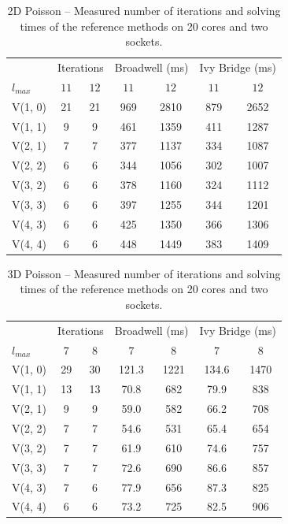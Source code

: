 \begin{table}
	\caption[2D Poisson -- Number of iterations and solving times of the reference methods]{2D Poisson -- Measured number of iterations and solving times of the reference methods on 20 cores and two sockets.}
	\label{table:poisson-2D-reference-methods}
	\centering
	\begin{tabular}{l c c c c c c}
		\toprule
		& \multicolumn{2}{c}{Iterations} & \multicolumn{2}{c}{Broadwell (ms)} & \multicolumn{2}{c}{Ivy Bridge (ms)} \\
		\cmidrule(r){2-3} \cmidrule(r){4-5} \cmidrule(r){6-7}
		$l_{max}$ & $11$& $12$ & $11$ & $12$ & $11$ & $12$\\
		\midrule
		V(1, 0) & 21 & 21 & 969 & 2810 & 879 & 2652 \\
		\midrule
		V(1, 1) & 9 & 9 & 461 & 1359 & 411 & 1287 \\
		\midrule
		V(2, 1) & 7 & 7 & 377 & 1137 & 334 & 1087\\
		\midrule
		V(2, 2) & 6 & 6 & 344 & 1056 & 302 & 1007 \\
		\midrule
		V(3, 2) & 6 & 6 & 378 & 1160 & 324 & 1112 \\
		\midrule
		V(3, 3) & 6 & 6 & 397 & 1255 & 344 & 1201 \\
		\midrule
		V(4, 3) & 6 & 6 & 425 & 1350 & 366 & 1306 \\
		\midrule
		V(4, 4) & 6 & 6 & 448 & 1449 & 383 & 1409\\
		\bottomrule
	\end{tabular}
\end{table}
\begin{table}
	\caption[3D Poisson -- Number of iterations and solving times of the reference methods]{3D Poisson -- Measured number of iterations and solving times of the reference methods on 20 cores and two sockets.}
	\label{table:poisson-3D-reference-methods}
	\centering
	\begin{tabular}{l c c c c c c}
		\toprule
		& \multicolumn{2}{c}{Iterations} & \multicolumn{2}{c}{Broadwell (ms)} & \multicolumn{2}{c}{Ivy Bridge (ms)} \\
		\cmidrule(r){2-3} \cmidrule(r){4-5} \cmidrule(r){6-7}
		$l_{max}$ & $7$& $8$ & $7$ & $8$ & $7$ & $8$\\
		\midrule
		V(1, 0) & 29 & 30 & 121.3 &1221 & 134.6 & 1470 \\
		\midrule
		V(1, 1) & 13 & 13 & 70.8 & 682 & 79.9 & 838 \\
		\midrule
		V(2, 1) & 9 & 9 & 59.0 & 582 & 66.2 & 708 \\
		\midrule
		V(2, 2) & 7 & 7 & 54.6 & 531 & 65.4 & 654 \\
		\midrule
		V(3, 2) & 7 & 7 & 61.9 & 610 & 74.6 & 757 \\
		\midrule
		V(3, 3) & 7 & 7 & 72.6 & 690 & 86.6 & 857 \\
		\midrule
		V(4, 3) & 7 & 6 & 77.9 & 656 & 87.3 & 825 \\
		\midrule
		V(4, 4) & 6 & 6 & 73.2 & 725 & 82.5 & 906 \\
		\bottomrule
	\end{tabular}
\end{table}
